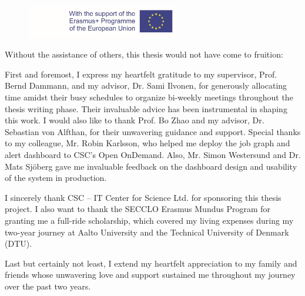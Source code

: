 \begin{figure}[tb]
  \centering
  \includegraphics[width=0.6\textwidth]{figures/EM.pdf}
\end{figure}

Without the assistance of others, this thesis would not have come to fruition:

First and foremost, I express my heartfelt gratitude to my supervisor, Prof. Bernd Dammann, and my advisor, Dr. Sami Ilvonen, for generously allocating time amidst their busy schedules to organize bi-weekly meetings throughout the thesis writing phase. Their invaluable advice has been instrumental in shaping this work. I would also like to thank Prof. Bo Zhao and my advisor, Dr. Sebastian von Alfthan, for their unwavering guidance and support. Special thanks to my colleague, Mr. Robin Karlsson, who helped me deploy the job graph and alert dashboard to CSC's Open OnDemand. Also, Mr. Simon Westersund and Dr. Mats Sjöberg gave me invaluable feedback on the dashboard design and usability of the system in production.

I sincerely thank CSC -- IT Center for Science Ltd. for sponsoring this thesis project. I also want to thank the SECCLO Erasmus Mundus Program for granting me a full-ride scholarship, which covered my living expenses during my two-year journey at Aalto University and the Technical University of Denmark (DTU).

Last but certainly not least, I extend my heartfelt appreciation to my family and friends whose unwavering love and support sustained me throughout my journey over the past two years.
